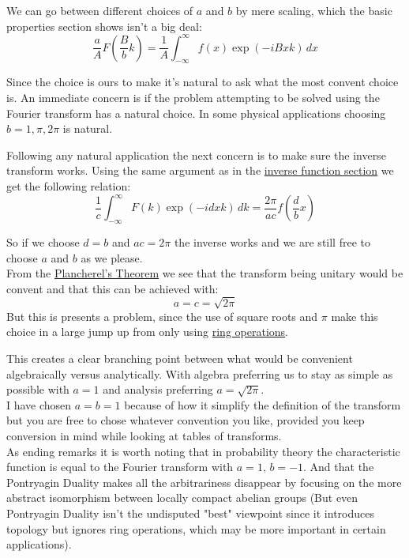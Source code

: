 \documentclass[12pt]{report}
\begin{document}
We can go between different choices of $a$ and $b$ by mere scaling, which the basic properties section shows isn't a big deal:
\[\frac{a}{A}F\left(\frac{B}{b}k\right) = \frac{1}{A}\int_{-\infty}^{\infty}f(x)\exp(-iBxk)\,dx\]

Since the choice is ours to make it's natural to ask what the most convent choice is.
An immediate concern is if the problem attempting to be solved using the Fourier transform has a natural choice.
In some physical applications choosing $b= 1,\pi,2\pi$ is natural.

Following any natural application the next concern is to make sure the inverse transform works.
Using the same argument as in the \hyperref[sec:inv-trans]{inverse function section} we get the following relation:
\[\frac{1}{c}\int_{-\infty}^{\infty}F(k)\exp(-idxk)\,dk = \frac{2\pi}{ac}f\left(\frac{d}{b}x\right)\]

So if we choose $d=b$ and $ac = 2\pi$ the inverse works and we are still free to choose $a$ and $b$ as we please.
\\

From the \hyperref[sec:plancherel]{Plancherel's Theorem} we see that the transform being unitary would be convent and that this can be achieved with:
\[a = c = \sqrt{2\pi}\]
But this is presents a problem, since the use of square roots and $\pi$ make this choice in a large jump up from only using \hyperref[sec:ring]{ring operations}.

This creates a clear branching point between what would be convenient algebraically versus analytically.
With algebra preferring us to stay as simple as possible with $a=1$ and analysis preferring $a=\sqrt{2\pi}$.
\\

I have chosen $a=b=1$ because of how it simplify the definition of the transform but you are free to chose whatever convention you like, provided you keep conversion in mind while looking at tables of transforms.
\\

As ending remarks it is worth noting that in probability theory the characteristic function is equal to the Fourier transform with $a=1,\,b=-1$. 
And that the Pontryagin Duality makes all the arbitrariness disappear by focusing on the more abstract isomorphism between locally compact abelian groups (But even Pontryagin Duality isn't the undisputed "best" viewpoint since it introduces topology but ignores ring operations, which may be more important in certain applications).
\end{document}
